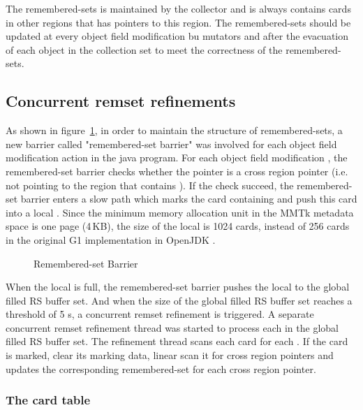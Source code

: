 The remembered-sets is maintained by the collector and is always contains cards in other regions that has pointers to this region.
The remembered-sets should be updated at every object field modification bu mutators and after
the evacuation of each object in the collection set to meet the correctness of the remembered-sets.

\subsection{Concurrent remset refinements}

As shown in figure~\ref{fig:remsetbarrier}, in order to maintain the structure of remembered-sets,
a new barrier called "remembered-set barrier" was involved for each object field modification action in the java program.
For each object field modification , the remembered-set barrier checks
whether the pointer  is a cross region pointer (i.e. not pointing to the region that contains ).
If the check succeed, the remembered-set barrier enters a slow path which marks the
card containing  and push this card into a local .
Since the minimum memory allocation unit in the MMTk metadata space is one page (4\,KB), the size of
the local  is 1024 cards, instead of 256 cards in the original G1 implementation in OpenJDK \cite{detlefs2004garbage}.

\begin{figure}
  \centering
  
  \caption{Remembered-set Barrier}
  \label{fig:remsetbarrier}
\end{figure}

When the local  is full, the remembered-set barrier
pushes the local  to the global filled RS buffer set.
And when the size of the global filled RS buffer set reaches a threshold of 5 s,
a concurrent remset refinement is triggered.
A separate concurrent remset refinement thread was started to process each
 in the global filled RS buffer set.
The refinement thread scans each card for each .
If the card is marked, clear its marking data, linear scan it for cross region pointers
and updates the corresponding remembered-set for each cross region pointer.

\subsubsection{The card table}

